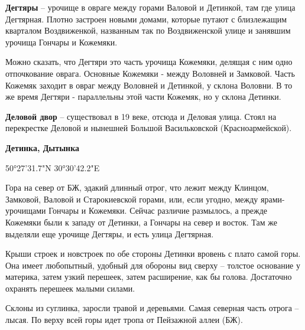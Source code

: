 \medskip

\textbf{Дегтяры} – урочище в овраге между горами Валовой и Детинкой, там где улица Дегтярная. Плотно застроен новыми домами, которые путают с близлежащим кварталом Воздвиженкой, названным так по Воздвиженской улице и занявшим урочища Гончары и Кожемяки. 

Можно сказать, что Дегтяри это часть урочища Кожемяки, делящая с ним одно отпочкование оврага. Основные Кожемяки - между Воловней и Замковой. Часть Кожемяк заходит в овраг между Воловней и Детинкой, у склона Воловни. В то же время Дегтяри - параллельны этой части Кожемяк, но у склона Детинки.\\

\medskip

\textbf{Деловой двор} – существовал в 19 веке, отсюда и Деловая улица. Стоял на перекрестке Деловой и нынешней Большой Васильковской (Красноармейской).\\

\medskip

\textbf{Детинка, Дытынка} 

50°27'31.7"N 30°30'42.2"E


Гора на север от БЖ, эдакий длинный отрог, что лежит между Клинцом, Замковой, Валовой и Старокиевской горами, или, если угодно, между ярами-урочищами Гончары и Кожемяки. Сейчас различие размылось, а прежде Кожемяки были к  западу от Детинки, а Гончары на север и восток. Там же выделяли еще урочище Дегтяры, и есть улица Дегтярная.

Крыши строек и новстроек по обе стороны Детинки вровень с плато самой горы. Она имеет любопытный, удобный для обороны вид сверху – толстое основание у материка, затем узкий перешеек, затем расширение, как бы голова. Достаточно охранять перешеек малыми силами.

Склоны из суглинка, заросли травой и деревьями. Самая северная часть отрога – лысая. По верху всей горы идет тропа от Пейзажной аллеи (БЖ).\\ 

